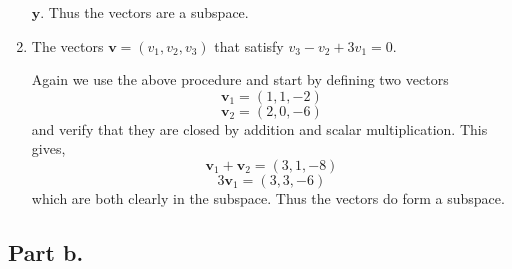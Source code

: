 \begin{enumerate}[label=(\arabic*)]
\begin{mdframed}[style=MyFrame]
            $\mathbf{y}$. Thus the vectors are a subspace.
        \end{mdframed}
    \item The vectors $\mathbf{v} =(v_{1}, v_{2}, v_{3})$ that satisfy 
        $v_{3}-v_{2}+3v_{1}=0$.
        \begin{mdframed}[style=MyFrame]
            Again we use the above procedure and start by defining two
            vectors
            \begin{equation}
                \mathbf{v}_{1} = (1,1,-2)
            \end{equation}
            \begin{equation}
                \mathbf{v}_{2} = (2,0,-6)
            \end{equation}
            and verify that they are closed by addition and scalar
            multiplication. This gives,
            \begin{equation}
                \mathbf{v}_{1} + \mathbf{v}_{2} = (3,1,-8)
            \end{equation}
            \begin{equation}
                3\mathbf{v}_{1} = (3,3,-6)
            \end{equation}
            which are both clearly in the subspace. Thus the vectors do form
            a subspace.
        \end{mdframed}
\end{enumerate}

\subsection{Part b.}

